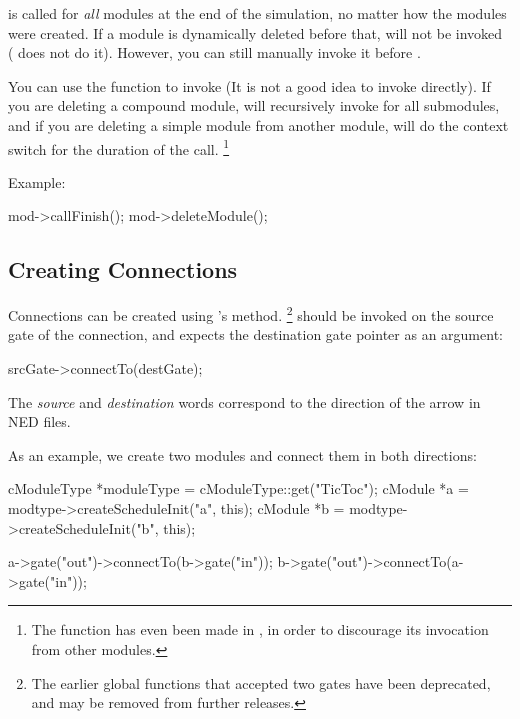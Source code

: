  is called for \textit{all} modules at the end of the
simulation, no matter how the modules were created. If a module is
dynamically deleted before that,  will not be invoked
( does not do it). However, you can still manually
invoke it before .

You can use the  function to invoke 
(It is not a good idea to invoke  directly). If you are
deleting a compound module,  will recursively invoke
 for all submodules, and if you are deleting a simple
module from another module,  will do the context switch
for the duration of the call.
  \footnote{The  function has even been made 
  in , in order to discourage its invocation from
  other modules.}

Example:

\begin{cpp}
mod->callFinish();
mod->deleteModule();
\end{cpp}


\subsection{Creating Connections}

Connections can be created using 's 
method.
  \footnote{The earlier  global functions that
  accepted two gates have been deprecated, and may be removed
  from further {\opp} releases.}
 should be invoked on the source gate
of the connection, and expects the destination gate pointer as
an argument:

\begin{cpp}
srcGate->connectTo(destGate);
\end{cpp}

The \textit{source} and \textit{destination} words correspond
to the direction of the arrow in NED files.

As an example, we create two modules and connect them in both directions:

\begin{cpp}
cModuleType *moduleType = cModuleType::get("TicToc");
cModule *a = modtype->createScheduleInit("a", this);
cModule *b = modtype->createScheduleInit("b", this);

a->gate("out")->connectTo(b->gate("in"));
b->gate("out")->connectTo(a->gate("in"));
\end{cpp}

